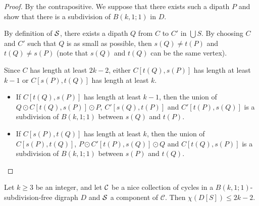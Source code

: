 \documentclass{endm}
\begin{document}
\begin{proof}
By the contrapositive. We suppose that there exists such a dipath $P$ and show that there is a subdivision of $B(k,1;1)$ in $D$.

By definition of ${\cal S}$, there exists a dipath $Q$ from $C$ to $C'$ in $\bigcup S$. By choosing $C$ and $C'$ such that 
$Q$ is as small as possible, then $s(Q) \not = t(P)$ and $t(Q) \not = s(P)$ (note that $s(Q)$ and $t(Q)$ can be the same vertex). 

Since $C$ has length at least $2k-2$, either $C[t(Q), s(P)]$ has length at least $k-1$ or $C[s(P), t(Q)]$ has length at least $k$. 

\begin{itemize}
	\item If $C[t(Q), s(P)]$ has length at least $k-1$, then the union of $Q \odot C[t(Q), s(P)] \odot P$, $C'[s(Q), t(P)]$ and $C'[ t(P), s(Q)]$
	is a subdivision of $B(k,1;1)$ between $s(Q)$ and $t(P)$. 
	\item If $C[s(P), t(Q)]$ has length at least $k$, then the union of $C[s(P), t(Q)]$, $P \odot C'[t(P), s(Q)] \odot Q$ and $C[t(Q), s(P)]$
	is a subdivision of $B(k,1;1)$ between $s(P)$ and $t(Q)$. 
\end{itemize}
\end{proof}


\begin{lemma}\label{lem:compo1}
Let $k\geq 3$ be an integer, and let ${\cal C}$ be a nice collection of cycles in a $B(k,1;1)$-subdivision-free digraph $D$ and ${\cal S}$ a component of $\mathcal{C}$. Then $\chi(D[S]) \leq 2k-2$.	 
\end{lemma}
\end{document}
